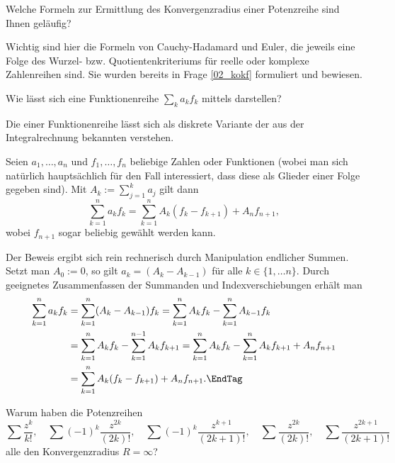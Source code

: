 \begin{frage}
Welche Formeln zur Ermittlung des Konvergenzradius einer 
Potenzreihe sind Ihnen geläufig?
\end{frage}

\begin{antwort}
 Wichtig sind hier 
die Formeln von Cauchy-Hadamard und Euler, die 
jeweils eine Folge des Wurzel- bzw. Quotientenkriteriums für 
reelle oder komplexe Zahlenreihen sind. Sie wurden bereits in Frage 
\ref{02_kokf} formuliert und bewiesen.
\AntEnd
\end{antwort}

\begin{frage}\label{04_part}
Wie lässt sich eine Funktionenreihe $\sum_k a_k f_k$ mittels 
 darstellen?
\end{frage}

\begin{antwort}
Die  einer Funktionenreihe 
lässt sich als diskrete Variante 
der aus der Integralrechnung bekannten  verstehen. 

Seien $a_1,\ldots, a_n$ und $f_1,\ldots,f_n$ beliebige 
Zahlen oder Funktionen (wobei man sich natürlich 
hauptsächlich für den Fall interessiert, dass diese als Glieder einer 
Folge gegeben sind). Mit $A_k := \sum_{j=1}^k a_j$ gilt dann
\[
\boxed{
\sum_{k=1}^n a_k f_k = \sum_{k=1}^n A_k ( f_k-f_{k+1} ) + A_n f_{n+1}, }
\]
wobei $f_{n+1}$ sogar beliebig gewählt werden kann.

Der Beweis ergibt sich rein rechnerisch durch Manipulation 
endlicher Summen. Setzt man $A_0 :=0$, so gilt $a_k=(A_k-A_{k-1})$ 
für alle $k\in\{ 1,\ldots n \}$. Durch geeignetes Zusammenfassen  
der Summanden und Indexverschiebungen erhält man
\begin{align}
\sum_{k=1}^n a_k f_k &= 
\sum_{k=1}^n ( A_k-A_{k-1} ) f_k = 
\sum_{k=1}^n A_k f_k - \sum_{k=1}^n A_{k-1} f_k \notag \\
&=
\sum_{k=1}^n A_k f_k -\sum_{k=1}^{n-1} A_k f_{k+1} = 
\sum_{k=1}^n A_k f_k -\sum_{k=1}^{n} A_k f_{k+1} + A_n f_{n+1} \notag \\ 
&= 
\sum_{k=1}^n A_k ( f_k-f_{k+1} ) + A_n f_{n+1}.\EndTag
\end{align}
\end{antwort}

\begin{frage}
Warum haben die Potenzreihen
\[
\sum \frac{z^k}{k!},\quad
\sum (-1)^k \frac{z^{2k}}{(2k)!},\quad
\sum (-1)^k \frac{z^{k+1}}{(2k+1)!},\quad
\sum \frac{z^{2k}}{(2k)!},\quad
\sum \frac{z^{2k+1}}{(2k+1)!}
\]
alle den Konvergenzradius $R=\infty$? 
\end{frage}

